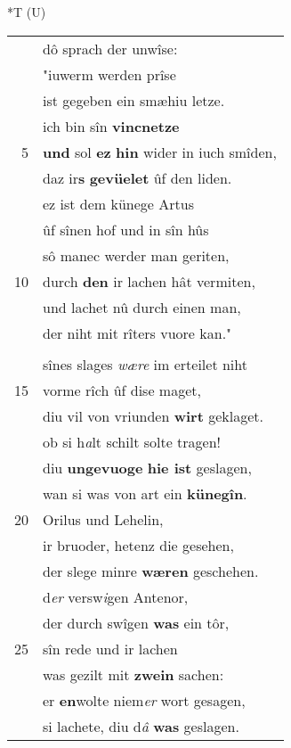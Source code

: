 \documentclass[8pt,a4paper,notitlepage]{article}
\begin{document}
\begin{table}[ht]
\begin{minipage}[t]{0.5\linewidth}
\small
\begin{center}*T (U)
\end{center}
\begin{tabular}{rl}
 & dô sprach der unwîse:\\ 
 & "iuwerm werden prîse\\ 
 & ist gegeben ein smæhiu letze.\\ 
 & ich bin sîn \textbf{vincnetze}\\ 
5 & \textbf{und} sol \textbf{ez} \textbf{hin} wider in iuch smîden,\\ 
 & daz ir\textbf{s} \textbf{gevüelet} ûf den liden.\\ 
 & ez ist dem künege Artus\\ 
 & ûf sînen hof und in sîn hûs\\ 
 & sô manec werder man geriten,\\ 
10 & durch \textbf{den} ir lachen hât vermiten,\\ 
 & und lachet nû durch einen man,\\ 
 & der niht mit rîters vuore kan."\\ 
 & \textbf{\begin{large}D\end{large}urch zorn} wunders vil geschiht.\\ 
 & sînes slages \textit{wære} im erteilet niht\\ 
15 & vorme rîch ûf dise maget,\\ 
 & diu vil von vriunden \textbf{wirt} geklaget.\\ 
 & ob si h\textit{a}lt schilt solte tragen!\\ 
 & diu \textbf{ungevuoge} \textbf{hie ist} geslagen,\\ 
 & wan si was von art ein \textbf{künegîn}.\\ 
20 & Orilus und Lehelin,\\ 
 & ir bruoder, hetenz die gesehen,\\ 
 & der slege minre \textbf{wæren} geschehen.\\ 
 & d\textit{er} versw\textit{i}gen Antenor,\\ 
 & der durch swîgen \textbf{was} ein tôr,\\ 
25 & sîn rede und ir lachen\\ 
 & was gezilt mit \textbf{zwein} sachen:\\ 
 & er \textbf{en}wolte niem\textit{er} wort gesagen,\\ 
 & si lachete, diu d\textit{â} \textbf{was} geslagen.\\ 

\end{tabular}
\end{minipage}
\end{table}
\end{document}
